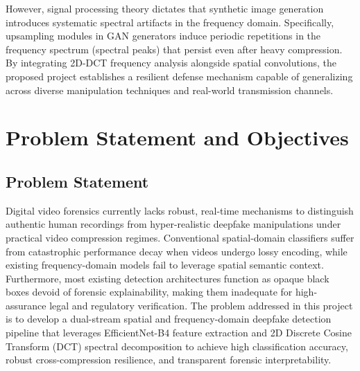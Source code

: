 \documentclass[12pt,a4paper]{report}
\begin{document}
However, signal processing theory dictates that synthetic image generation introduces systematic spectral artifacts in the frequency domain. Specifically, upsampling modules in GAN generators induce periodic repetitions in the frequency spectrum (spectral peaks) that persist even after heavy compression. By integrating 2D-DCT frequency analysis alongside spatial convolutions, the proposed project establishes a resilient defense mechanism capable of generalizing across diverse manipulation techniques and real-world transmission channels.

\newpage

\chapter{Problem Statement and Objectives}

\section{Problem Statement}
Digital video forensics currently lacks robust, real-time mechanisms to distinguish authentic human recordings from hyper-realistic deepfake manipulations under practical video compression regimes. Conventional spatial-domain classifiers suffer from catastrophic performance decay when videos undergo lossy encoding, while existing frequency-domain models fail to leverage spatial semantic context. Furthermore, most existing detection architectures function as opaque black boxes devoid of forensic explainability, making them inadequate for high-assurance legal and regulatory verification. The problem addressed in this project is to develop a dual-stream spatial and frequency-domain deepfake detection pipeline that leverages EfficientNet-B4 feature extraction and 2D Discrete Cosine Transform (DCT) spectral decomposition to achieve high classification accuracy, robust cross-compression resilience, and transparent forensic interpretability.
\end{document}
